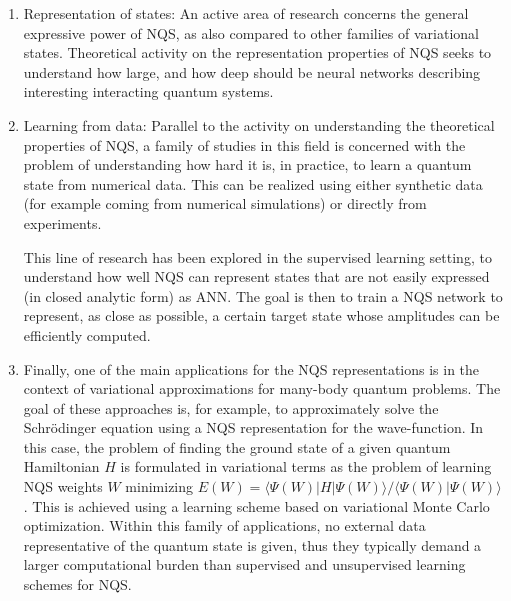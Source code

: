 \documentclass[%
oneside,                 %
final,                   %
10pt]{article}
\begin{document}
\begin{enumerate}
\item Representation of states: An active area of research concerns the general expressive power
of NQS, as also compared to other families of variational states.
Theoretical activity on the representation properties
of NQS seeks to understand how large, and how deep
should be neural networks describing interesting interacting quantum systems.
\item Learning from data: Parallel to the activity on understanding the theoretical properties of NQS,
a family of studies in this field is concerned with the
problem of understanding how hard it is, in practice, to learn
a quantum state from numerical data.
This can be realized using either synthetic data (for example coming from numerical simulations)
or directly from experiments.

This line of research has been explored in the supervised learning setting, to
understand how well NQS can represent states that are not easily expressed (in closed analytic form) as ANN.
The goal is then to train a NQS network to represent, as close as possible, a certain target state
whose amplitudes can be efficiently computed.
\item Finally, one of the main applications for the NQS representations is in the context
of variational approximations for many-body quantum problems.
The goal of these approaches is, for example, to approximately solve the Schr\"{o}dinger equation using a NQS representation for the wave-function.
In this case, the problem of finding the ground state of a given quantum Hamiltonian $H$ is formulated in variational terms as the problem of learning NQS weights $W$
minimizing $E(W)=\langle\Psi(W)|H|\Psi(W)\rangle/\langle\Psi(W)|\Psi(W)\rangle$. This is achieved using a learning scheme based on variational
Monte Carlo optimization.
Within this family of applications,
no external data representative of the quantum state is given, thus they typically demand a larger computational burden than supervised and unsupervised learning schemes for NQS.
\end{enumerate}
\end{document}
